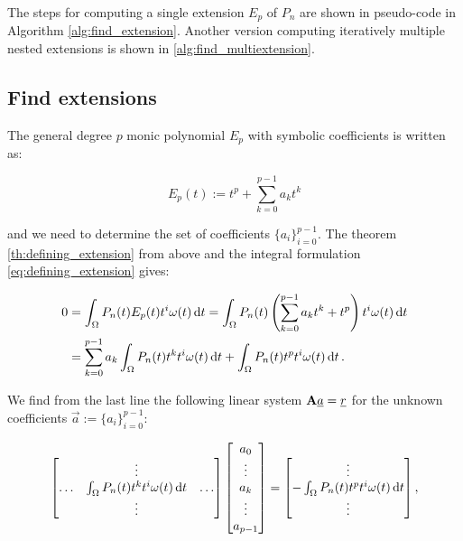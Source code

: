 \documentclass[a4paper,10pt]{article}
\begin{document}
The steps for computing a single extension $E_p$ of $P_n$ are shown in pseudo-code
in Algorithm \ref{alg:find_extension}. Another version computing iteratively
multiple nested extensions is shown in \ref{alg:find_multiextension}.


\subsection{Find extensions}

The general degree $p$ monic polynomial $E_p$ with symbolic coefficients is
written as:

\begin{equation}
  E_p(t) := t^p + \sum_{k=0}^{p-1} a_k t^k
\end{equation}

and we need to determine the set of coefficients $\{a_i\}_{i=0}^{p-1}$.
The theorem \ref{th:defining_extension} from above and the integral formulation
\eqref{eq:defining_extension} gives:

\begin{equation}
\begin{split}
  0 & = \int_\Omega P_n(t) E_p(t) t^i \omega(t) \,\mathrm{d}t
      = \int_\Omega P_n(t) \left(\sum_{k=0}^{p-1} a_k t^k + t^p\right) t^i \omega(t) \,\mathrm{d}t \\
    & = \sum_{k=0}^{p-1} a_k \int_\Omega P_n(t) t^k t^i \omega(t) \,\mathrm{d}t
      + \int_\Omega P_n(t) t^p t^i \omega(t) \,\mathrm{d}t \,.
\end{split}
\end{equation}

We find from the last line the following linear system $\mathbf{A} \underline{a} = \underline{r}$
for the unknown coefficients $\vec{a} := \{a_i\}_{i=0}^{p-1}$:

\begin{equation}
  \label{eq:linsys_for_extension}
  \begin{bmatrix}
    {}     & \vdots                                        & {} \\
    \hdots & \int_\Omega P_n(t) t^k t^i \omega(t) \,\mathrm{d}t & \hdots \\
    {}     & \vdots                                        & {} \\
  \end{bmatrix}
  \begin{bmatrix}
    a_0 \\
    \vdots \\
    a_k \\
    \vdots \\
    a_{p-1}
  \end{bmatrix}
  =
  \begin{bmatrix}
  \vdots \\
  - \int_\Omega P_n(t) t^p t^i \omega(t) \,\mathrm{d}t \\
  \vdots \\
  \end{bmatrix},
\end{equation}
\end{document}
